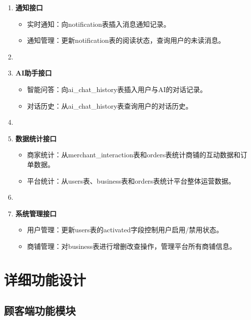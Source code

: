 \begin{enumerate}
    \item \textbf{通知接口}
          \begin{itemize}
              \item 实时通知：向notification表插入消息通知记录。
              \item 通知管理：更新notification表的阅读状态，查询用户的未读消息。
          \end{itemize}

    \item[]

    \item \textbf{AI助手接口}
          \begin{itemize}
              \item 智能问答：向ai\_chat\_history表插入用户与AI的对话记录。
              \item 对话历史：从ai\_chat\_history表查询用户的对话历史。
          \end{itemize}

    \item[]

    \item \textbf{数据统计接口}
          \begin{itemize}
              \item 商家统计：从merchant\_interaction表和orders表统计商铺的互动数据和订单数据。
              \item 平台统计：从users表、business表和orders表统计平台整体运营数据。
          \end{itemize}

    \item[]

    \item \textbf{系统管理接口}
          \begin{itemize}
              \item 用户管理：更新users表的activated字段控制用户启用/禁用状态。
              \item 商铺管理：对business表进行增删改查操作，管理平台所有商铺信息。
          \end{itemize}

\end{enumerate}

\section{详细功能设计}

\subsection{顾客端功能模块}

